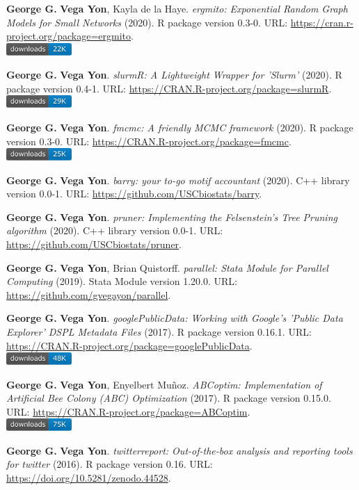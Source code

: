 \item \textbf{George G.} \textbf{Vega Yon}, Kayla de la Haye. \textit{ergmito: Exponential Random Graph Models for Small Networks} (2020). R package version 0.3-0. {\small URL}: \url{https://cran.r-project.org/package=ergmito}. \\\includegraphics[width=2.5cm]{fig/cran-downloads-ergmito.pdf} 
\item \textbf{George G.} \textbf{Vega Yon}. \textit{slurmR: A Lightweight Wrapper for 'Slurm'} (2020). R package version 0.4-1. {\small URL}: \url{https://CRAN.R-project.org/package=slurmR}. \\\includegraphics[width=2.5cm]{fig/cran-downloads-slurmr.pdf} 
\item \textbf{George G.} \textbf{Vega Yon}. \textit{fmcmc: A friendly MCMC framework} (2020). R package version 0.3-0. {\small URL}: \url{https://CRAN.R-project.org/package=fmcmc}. \\\includegraphics[width=2.5cm]{fig/cran-downloads-fmcmc.pdf} 
\item \textbf{George G.} \textbf{Vega Yon}. \textit{barry: your to-go motif accountant} (2020). C++ library version 0.0-1. {\small URL}: \url{https://github.com/USCbiostats/barry}.  
\item \textbf{George G.} \textbf{Vega Yon}. \textit{pruner: Implementing the Felsenstein's Tree Pruning algorithm} (2020). C++ library version 0.0-1. {\small URL}: \url{https://github.com/USCbiostats/pruner}.  
\item \textbf{George G.} \textbf{Vega Yon}, Brian Quistorff. \textit{parallel: Stata Module for Parallel Computing} (2019). Stata Module version 1.20.0. {\small URL}: \url{https://github.com/gvegayon/parallel}.  
\item \textbf{George G.} \textbf{Vega Yon}. \textit{googlePublicData: Working with Google's 'Public Data Explorer' DSPL Metadata Files} (2017). R package version 0.16.1. {\small URL}: \url{https://CRAN.R-project.org/package=googlePublicData}. \\\includegraphics[width=2.5cm]{fig/cran-downloads-googlepublicdata.pdf} 
\item \textbf{George G.} \textbf{Vega Yon}, Enyelbert Muñoz. \textit{ABCoptim: Implementation of Artificial Bee Colony (ABC) Optimization} (2017). R package version 0.15.0. {\small URL}: \url{https://CRAN.R-project.org/package=ABCoptim}. \\\includegraphics[width=2.5cm]{fig/cran-downloads-abcoptim.pdf} 
\item \textbf{George G.} \textbf{Vega Yon}. \textit{{twitterreport: Out-of-the-box analysis and 
	reporting tools for twitter}} (2016). R package version 0.16. {\small URL}: \url{https://doi.org/10.5281/zenodo.44528}.  
